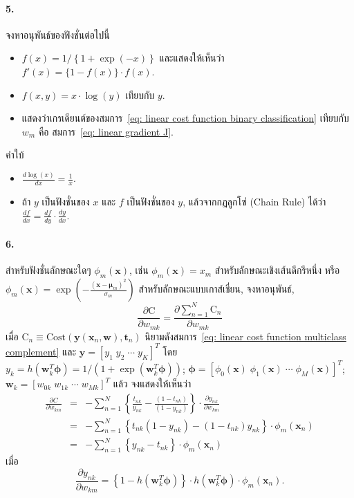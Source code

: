 \paragraph{5.} จงหาอนุพันธ์ของฟังชั่นต่อไปนี้
\begin{itemize}
\item $f(x) = 1/\left\{ 1 + \exp(-x) \right\}$ และแสดงให้เห็นว่า $f'(x) = \{1 - f(x)\} \cdot f(x)$.
\item $f(x,y) = x \cdot \log( y )$ เทียบกับ $y$.
\item แสดงว่าเกรเดียนต์ของสมการ~\ref{eq: linear cost function binary classification} เทียบกับ $w_m$ คือ สมการ~\ref{eq: linear gradient J}.
\end{itemize}
คำใบ้
\begin{itemize}
\item $\frac{d \log(x)}{d x} = \frac{1}{x}$.
\item ถ้า $y$ เป็นฟังชั่นของ $x$ และ $f$ เป็นฟังชั่นของ $y$, 
แล้วจากกฏลูกโซ่ (Chain Rule) ได้ว่า
$\frac{d f}{d x} = \frac{d f}{d y} \cdot \frac{d y}{d x}$.
\end{itemize}

\paragraph{6.} สำหรับฟังชั่นลักษณะใดๆ $\phi_m(\mathbf{x})$, เช่น $\phi_m(\mathbf{x}) = x_m$ สำหรับลักษณะเชิงเส้นดีกรีหนึ่ง 
หรือ $\phi_m(\mathbf{x}) = \exp( - \frac{(\mathbf{x} -\mathbf{\mu}_m )^2}{\sigma_m} ) $ สำหรับลักษณะแบบเกาส์เชี่ยน, จงหาอนุพันธ์,
\[
\frac{\partial \mathrm{C}}{\partial w_{mk}} 
=\frac{\partial \sum_{n=1}^N \mathrm{C}_n}{\partial w_{mk}}
\]
เมื่อ $\mathrm{C}_n \equiv \mathrm{Cost}(\mathbf{y}(\mathbf{x}_n, \mathbf{w}), \mathbf{t}_n)$ นิยามดังสมการ~\ref{eq: linear cost function multiclass complement} 
และ $\mathbf{y} = [y_1 \; y_2 \; \cdots \; y_K]^T$ โดย
$y_k = h( \mathbf{w}_k^T \mathbf{\phi}) = 1/(1 + \exp( \mathbf{w}_k^T \mathbf{\phi}))$;
$\mathbf{\phi} = [\phi_0(\mathbf{x}) \; \phi_1(\mathbf{x}) \; \cdots \; \phi_M(\mathbf{x})]^T$;
$\mathbf{w}_k = [w_{0k} \; w_{1k} \; \cdots \; w_{Mk}]^T$
แล้ว จงแสดงให้เห็นว่า
\begin{eqnarray}
   \frac{\partial C}{\partial w_{km}} &=& -\sum_{n=1}^N \left\{ \frac{t_{nk}}{y_{nk}} - \frac{(1 - t_{nk})}{(1 - y_{nk})} \right\} \cdot \frac{\partial y_{nk}}{\partial w_{km}}
\nonumber \\
   &=& -\sum_{n=1}^N \left\{ t_{nk} (1-y_{nk}) - (1-t_{nk}) y_{nk} \right\} \cdot \phi_m(\mathbf{x}_n)
\nonumber \\   
   &=& -\sum_{n=1}^N \left\{ y_{nk} - t_{nk} \right\} \cdot \phi_m(\mathbf{x}_n)
\label{eq: linear multicass grad dual cost}
\end{eqnarray}
เมื่อ
\[
   \frac{\partial y_{nk}}{\partial w_{km}} = \left\{ 1 - h(\mathbf{w}_k^T \mathbf{\phi}) \right\} \cdot h(\mathbf{w}_k^T \mathbf{\phi}) \cdot \phi_m(\mathbf{x}_n).
\]

